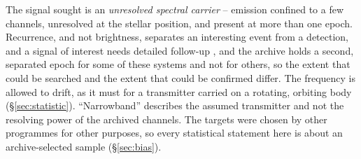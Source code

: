 The signal sought is an \emph{unresolved spectral carrier} -- emission confined
to a few channels, unresolved at the stellar position, and present at more
than one epoch. Recurrence, and not brightness, separates an interesting event from a detection, and a signal of interest needs detailed
follow-up \citep{Sheikh2021}, and the archive holds
a second, separated epoch for some of these systems and not for others, so
the extent that could be searched and the extent that could be confirmed differ. The
frequency is allowed to drift, as it must for a transmitter carried on a
rotating, orbiting body (\S\ref{sec:statistic}). ``Narrowband'' describes the
assumed transmitter and not the resolving power of the archived channels. The
targets were chosen by other programmes for other purposes, so every
statistical statement here is about an archive-selected sample
(\S\ref{sec:bias}).
